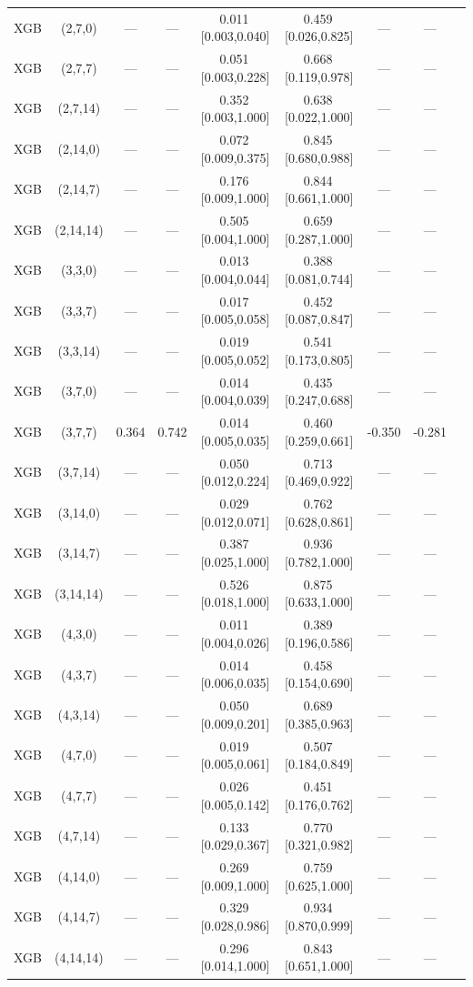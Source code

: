 \begin{longtable}{lcccccccc}
XGB & (2,7,0) & --- & --- & 0.011\,[0.003,0.040] & 0.459\,[0.026,0.825] & --- & --- \\
XGB & (2,7,7) & --- & --- & 0.051\,[0.003,0.228] & 0.668\,[0.119,0.978] & --- & --- \\
XGB & (2,7,14) & --- & --- & 0.352\,[0.003,1.000] & 0.638\,[0.022,1.000] & --- & --- \\
XGB & (2,14,0) & --- & --- & 0.072\,[0.009,0.375] & 0.845\,[0.680,0.988] & --- & --- \\
XGB & (2,14,7) & --- & --- & 0.176\,[0.009,1.000] & 0.844\,[0.661,1.000] & --- & --- \\
XGB & (2,14,14) & --- & --- & 0.505\,[0.004,1.000] & 0.659\,[0.287,1.000] & --- & --- \\
XGB & (3,3,0) & --- & --- & 0.013\,[0.004,0.044] & 0.388\,[0.081,0.744] & --- & --- \\
XGB & (3,3,7) & --- & --- & 0.017\,[0.005,0.058] & 0.452\,[0.087,0.847] & --- & --- \\
XGB & (3,3,14) & --- & --- & 0.019\,[0.005,0.052] & 0.541\,[0.173,0.805] & --- & --- \\
XGB & (3,7,0) & --- & --- & 0.014\,[0.004,0.039] & 0.435\,[0.247,0.688] & --- & --- \\
XGB & (3,7,7) & 0.364 & 0.742 & 0.014\,[0.005,0.035] & 0.460\,[0.259,0.661] & -0.350 & -0.281 \\
XGB & (3,7,14) & --- & --- & 0.050\,[0.012,0.224] & 0.713\,[0.469,0.922] & --- & --- \\
XGB & (3,14,0) & --- & --- & 0.029\,[0.012,0.071] & 0.762\,[0.628,0.861] & --- & --- \\
XGB & (3,14,7) & --- & --- & 0.387\,[0.025,1.000] & 0.936\,[0.782,1.000] & --- & --- \\
XGB & (3,14,14) & --- & --- & 0.526\,[0.018,1.000] & 0.875\,[0.633,1.000] & --- & --- \\
XGB & (4,3,0) & --- & --- & 0.011\,[0.004,0.026] & 0.389\,[0.196,0.586] & --- & --- \\
XGB & (4,3,7) & --- & --- & 0.014\,[0.006,0.035] & 0.458\,[0.154,0.690] & --- & --- \\
XGB & (4,3,14) & --- & --- & 0.050\,[0.009,0.201] & 0.689\,[0.385,0.963] & --- & --- \\
XGB & (4,7,0) & --- & --- & 0.019\,[0.005,0.061] & 0.507\,[0.184,0.849] & --- & --- \\
XGB & (4,7,7) & --- & --- & 0.026\,[0.005,0.142] & 0.451\,[0.176,0.762] & --- & --- \\
XGB & (4,7,14) & --- & --- & 0.133\,[0.029,0.367] & 0.770\,[0.321,0.982] & --- & --- \\
XGB & (4,14,0) & --- & --- & 0.269\,[0.009,1.000] & 0.759\,[0.625,1.000] & --- & --- \\
XGB & (4,14,7) & --- & --- & 0.329\,[0.028,0.986] & 0.934\,[0.870,0.999] & --- & --- \\
XGB & (4,14,14) & --- & --- & 0.296\,[0.014,1.000] & 0.843\,[0.651,1.000] & --- & --- \\
\end{longtable}
